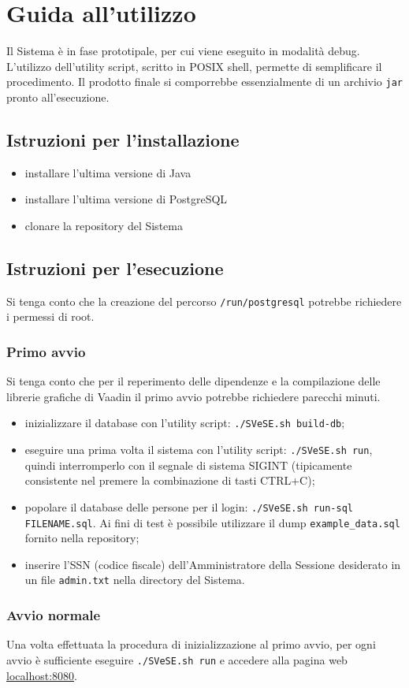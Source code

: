 \chapter{Guida all'utilizzo}\label{utilizzo}
Il Sistema è in fase prototipale, per cui viene eseguito in modalità debug. L'utilizzo dell'utility script, scritto in POSIX shell, permette di semplificare il procedimento. Il prodotto finale si comporrebbe essenzialmente di un archivio \verb!jar! pronto all'esecuzione.




\section{Istruzioni per l'installazione}
\begin{itemize}
\item installare l'ultima versione di Java
\item installare l'ultima versione di PostgreSQL
\item clonare la repository del Sistema
\end{itemize}




\section{Istruzioni per l'esecuzione}
Si tenga conto che la creazione del percorso \verb!/run/postgresql! potrebbe richiedere i permessi di root.

\subsection{Primo avvio}
Si tenga conto che per il reperimento delle dipendenze e la compilazione delle librerie grafiche di Vaadin il primo avvio potrebbe richiedere parecchi minuti.
\begin{itemize}
	\item inizializzare il database con l'utility script: \verb!./SVeSE.sh build-db!;
	\item eseguire una prima volta il sistema con l'utility script: \verb!./SVeSE.sh run!, quindi interromperlo con il segnale di sistema SIGINT (tipicamente consistente nel premere la combinazione di tasti CTRL+C);
	\item popolare il database delle persone per il login: \verb!./SVeSE.sh run-sql FILENAME.sql!. Ai fini di test è possibile utilizzare il dump \verb!example_data.sql! fornito nella repository;
	\item inserire l'SSN (codice fiscale) dell'Amministratore della Sessione desiderato in un file \verb!admin.txt! nella directory del Sistema.
\end{itemize}

\subsection{Avvio normale}
Una volta effettuata la procedura di inizializzazione al primo avvio, per ogni avvio è sufficiente eseguire \verb!./SVeSE.sh run! e accedere alla pagina web \url{localhost:8080}.
